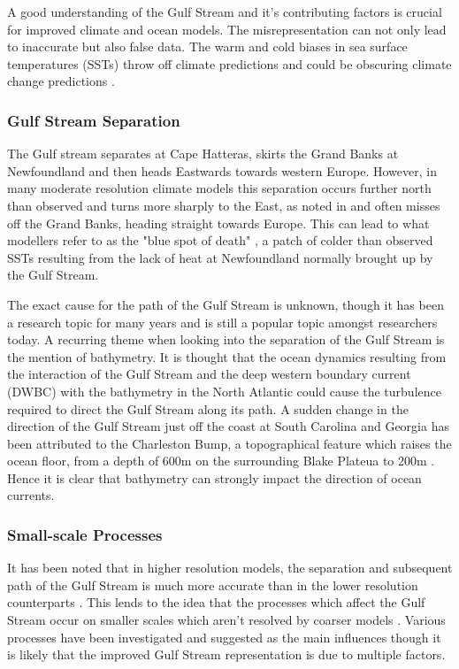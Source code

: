\documentclass[..\EOYR.tex]{subfiles}
\begin{document}
A good understanding of the Gulf Stream and it's contributing factors is crucial for improved climate and ocean models. The misrepresentation can not only lead to inaccurate but also false data. The warm and cold biases in sea surface temperatures (SSTs) throw off climate predictions and could be obscuring climate change predictions \citep{Saba2016}.


\subsubsection{Gulf Stream Separation}

The Gulf stream separates at Cape Hatteras, skirts the Grand Banks at Newfoundland and then heads Eastwards towards western Europe. However, in many moderate resolution climate models this separation occurs further north than observed and turns more sharply to the East, as noted in \citep{Hurlburt2008} and often misses off the Grand Banks, heading straight towards Europe. This can lead to what modellers refer to as the "blue spot of death" \citep{Gnanadesikan2007}, a patch of colder than observed SSTs resulting from the lack of heat at Newfoundland normally brought up by the Gulf Stream.

The exact cause for the path of the Gulf Stream is unknown, though it has been a research topic for many years and is still a popular topic amongst researchers today. A recurring theme when looking into the separation of the Gulf Stream is the mention of bathymetry. It is thought \citep{Gula2014}\citep{NaveiraGarabato2013}\citep{Nikurashin2012a} that the ocean dynamics resulting from the interaction of the Gulf Stream and the deep western boundary current (DWBC) with the bathymetry in the North Atlantic could cause the turbulence required to direct the Gulf Stream along its path. A sudden change in the direction of the Gulf Stream just off the coast at South Carolina and Georgia has been attributed to the Charleston Bump, a topographical feature which raises the ocean floor, from a depth of 600m on the surrounding Blake Plateua to 200m \citep{Gula2014}. Hence it is clear that bathymetry can strongly impact the direction of ocean currents.


\subsubsection{Small-scale Processes}

It has been noted that in higher resolution models, the separation and subsequent path of the Gulf Stream is much more accurate than in the lower resolution counterparts \citep{Hurlburt2008}\citep{Zhang2007}. This lends to the idea that the processes which affect the Gulf Stream occur on smaller scales which aren't resolved by coarser models \citep{NaveiraGarabato2013}\citep{Nikurashin2012a}. Various processes have been investigated and suggested as the main influences though it is likely that the improved Gulf Stream representation is due to multiple factors.
\end{document}
